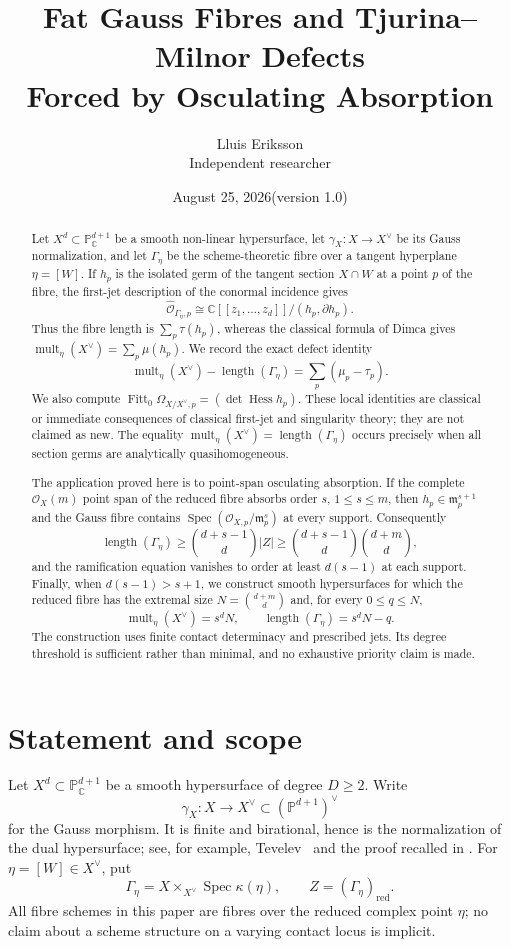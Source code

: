 \documentclass[11pt,a4paper]{article}
\title{Fat Gauss Fibres and Tjurina--Milnor Defects\\
Forced by Osculating Absorption}
\author{Lluis Eriksson\\\small Independent researcher}
\date{August 25, 2026\quad (version 1.0)}
\theoremstyle{definition}
\newcommand{\kk}{\mathbb C}
\newcommand{\PP}{\mathbb P}
\newcommand{\cO}{\mathcal O}
\newcommand{\m}{\mathfrak m}
\newcommand{\mult}{\operatorname{mult}}
\newcommand{\Fitt}{\operatorname{Fitt}}
\newcommand{\length}{\operatorname{length}}
\begin{document}
\maketitle

\begin{abstract}
Let $X^d\subset\PP^{d+1}_{\mathbb C}$ be a smooth non-linear hypersurface,
let $\gamma_X:X\to X^\vee$ be its Gauss normalization, and let $\Gamma_\eta$
be the scheme-theoretic fibre over a tangent hyperplane $\eta=[W]$.
If $h_p$ is the isolated germ of the tangent section $X\cap W$ at a point
$p$ of the fibre, the first-jet description of the conormal incidence gives
\[
 \widehat{\cO}_{\Gamma_\eta,p}
 \cong \kk[[z_1,\ldots,z_d]]/(h_p,\partial h_p).
\]
Thus the fibre length is $\sum_p\tau(h_p)$, whereas the classical formula
of Dimca gives $\mult_\eta(X^\vee)=\sum_p\mu(h_p)$.  We record the exact
defect identity
\[
 \mult_\eta(X^\vee)-\length(\Gamma_\eta)
 =\sum_p(\mu_p-\tau_p).
\]
We also compute
$\Fitt_0\Omega_{X/X^\vee,p}=(\det\operatorname{Hess}h_p)$.
These local identities are classical or immediate consequences of classical
first-jet and singularity theory; they are not claimed as new.  The equality
$\mult_\eta(X^\vee)=\length(\Gamma_\eta)$ occurs precisely when all section
germs are analytically quasihomogeneous.

The application proved here is to point-span osculating absorption.  If the complete
$\cO_X(m)$ point span of the reduced fibre absorbs order $s$, $1\le s\le m$,
then $h_p\in\m_p^{s+1}$ and the Gauss fibre contains
$\operatorname{Spec}(\cO_{X,p}/\m_p^s)$ at every support.  Consequently
\[
 \length(\Gamma_\eta)
 \geq \binom{d+s-1}{d}|Z|
 \geq \binom{d+s-1}{d}\binom{d+m}{d},
\]
and the ramification equation vanishes to order at least $d(s-1)$ at each
support.  Finally, when $d(s-1)>s+1$, we construct smooth hypersurfaces for
which the reduced fibre has the extremal size $N=\binom{d+m}{d}$ and, for
every $0\le q\le N$,
\[
 \mult_\eta(X^\vee)=s^dN,
 \qquad \length(\Gamma_\eta)=s^dN-q.
\]
The construction uses finite contact determinacy and prescribed jets.  Its
degree threshold is sufficient rather than minimal, and no exhaustive
priority claim is made.
\end{abstract}

\section{Statement and scope}

Let $X^d\subset\PP^{d+1}_{\kk}$ be a smooth hypersurface of degree $D\ge2$.
Write
\[
 \gamma_X:X\longrightarrow X^\vee\subset(\PP^{d+1})^\vee
\]
for the Gauss morphism.  It is finite and birational, hence is the
normalization of the dual hypersurface; see, for example,
Tevelev~\cite[Chapter~1]{Tevelev2005} and the proof recalled in
\cite[Lemma~2.1]{ErikssonDual2026}.  For $\eta=[W]\in X^\vee$, put
\[
 \Gamma_\eta=X\times_{X^\vee}\operatorname{Spec}\kappa(\eta),
 \qquad Z=(\Gamma_\eta)_{\mathrm{red}}.
\]
All fibre schemes in this paper are fibres over the reduced complex point
$\eta$; no claim about a scheme structure on a varying contact locus is
implicit.
\end{document}
